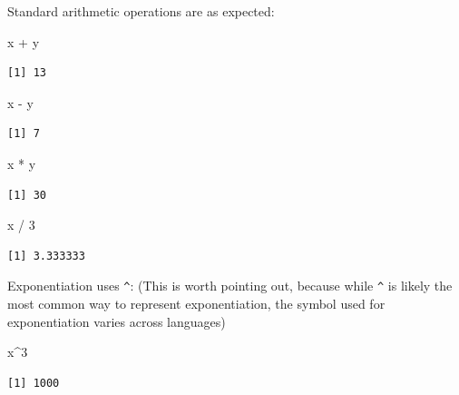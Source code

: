 \documentclass[
]{book}
\newenvironment{Shaded}{\begin{snugshade}}{\end{snugshade}}
\newcommand{\DecValTok}[1]{\textcolor[rgb]{0.00,0.00,0.81}{#1}}
\newcommand{\NormalTok}[1]{#1}
\newcommand{\SpecialCharTok}[1]{\textcolor[rgb]{0.00,0.00,0.00}{#1}}
\begin{document}
Standard arithmetic operations are as expected:

\begin{Shaded}
\begin{Highlighting}[]
\NormalTok{x }\SpecialCharTok{+}\NormalTok{ y}
\end{Highlighting}
\end{Shaded}

\begin{verbatim}
[1] 13
\end{verbatim}

\begin{Shaded}
\begin{Highlighting}[]
\NormalTok{x }\SpecialCharTok{{-}}\NormalTok{ y}
\end{Highlighting}
\end{Shaded}

\begin{verbatim}
[1] 7
\end{verbatim}

\begin{Shaded}
\begin{Highlighting}[]
\NormalTok{x }\SpecialCharTok{*}\NormalTok{ y}
\end{Highlighting}
\end{Shaded}

\begin{verbatim}
[1] 30
\end{verbatim}

\begin{Shaded}
\begin{Highlighting}[]
\NormalTok{x }\SpecialCharTok{/} \DecValTok{3}
\end{Highlighting}
\end{Shaded}

\begin{verbatim}
[1] 3.333333
\end{verbatim}

Exponentiation uses \texttt{\^{}}:
(This is worth pointing out, because while \texttt{\^{}} is likely the most common way to represent exponentiation, the symbol used for exponentiation varies across languages)

\begin{Shaded}
\begin{Highlighting}[]
\NormalTok{x}\SpecialCharTok{\^{}}\DecValTok{3}
\end{Highlighting}
\end{Shaded}

\begin{verbatim}
[1] 1000
\end{verbatim}
\end{document}
